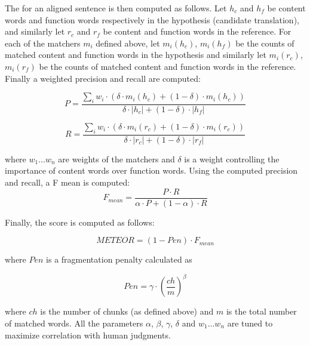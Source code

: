 The  for an aligned sentence is then computed as follows. Let
$h_c$ and $h_f$ be content words and function words respectively in the
hypothesis (candidate translation), and similarly let $r_c$ and $r_f$ be
content and function words in the reference. For each of the matchers $m_i$
defined above, let $m_i(h_c)$, $m_i(h_f)$ be the counts of matched content and
function words in the hypothesis and similarly let $m_i(r_c)$, $m_i(r_f)$ be
the counts of matched content and function words in the reference. Finally
a weighted precision and recall are computed:

\begin{equation*}
    P = \frac{
        \sum_i w_i \cdot ( \delta \cdot m_i(h_c) + (1-\delta) \cdot m_i(h_c))
    }{
        \delta \cdot |h_c| + (1-\delta) \cdot |h_f|
    }
\end{equation*}

\begin{equation*}
    R = \frac{
        \sum_i w_i \cdot ( \delta \cdot m_i(r_c) + (1-\delta) \cdot m_i(r_c))
    }{
        \delta \cdot |r_c| + (1-\delta) \cdot |r_f|
    }
\end{equation*}

\noindent where $w_1 \ldots w_n$ are weights of the matchers and $\delta$ is a weight
controlling the importance of content words over function words.
Using the computed precision and recall, a F mean is computed:
\begin{equation*}
    F_{mean} = \frac{
        P \cdot R
    }{
        \alpha \cdot P + (1 - \alpha) \cdot R
    }
\end{equation*}

\noindent Finally, the  score is computed as follows:

\begin{equation*}
    METEOR = (1-Pen)\cdot F_{mean}
\end{equation*}

\noindent where $Pen$ is a fragmentation penalty calculated as 

\begin{equation*}
    Pen = \gamma \cdot \left( \frac{ch}{m} \right)^\beta
\end{equation*}

\noindent where $ch$ is the number of chunks (as defined above) and $m$ is the
total number of matched words. All the parameters $\alpha$, $\beta$, $\gamma$,
$\delta$ and $w_1 \ldots w_n$ are tuned to maximize correlation with human
judgments.

